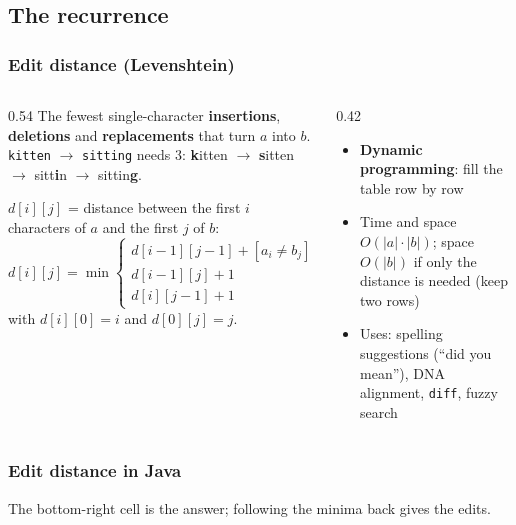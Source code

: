 \documentclass[aspectratio=169,10pt,compress]{beamer}
\begin{document}
\subsection[Recurrence]{The recurrence}




\begin{frame}[t,fragile] \frametitle{Edit distance (Levenshtein)}
  \begin{columns}[T]
    \begin{column}{0.54\textwidth}
      \small The fewest single-character \textbf{insertions}, \textbf{deletions} and \textbf{replacements}
      that turn $a$ into $b$. \texttt{kitten} $\to$ \texttt{sitting} needs 3:
      \textbf{k}itten $\to$ \textbf{s}itten $\to$ sitt\textbf{i}n $\to$ sittin\textbf{g}.

      \vspace{0.3em}
      $d[i][j]$ = distance between the first $i$ characters of $a$ and the first $j$ of $b$:
      \[
      	d[i][j] = \min
      	\begin{cases}
      		d[i-1][j-1] + [a_{i} \neq b_{j}] & \text{replace or keep} \\
      		d[i-1][j] + 1 & \text{delete } a_{i} \\
      		d[i][j-1] + 1 & \text{insert } b_{j}
      	\end{cases}
      \]
      with $d[i][0] = i$ and $d[0][j] = j$.
    \end{column}
    \begin{column}{0.42\textwidth}
      \begin{itemize}\small
        \item \textbf{Dynamic programming}: fill the table row by row
        \item Time and space $O(|a| \cdot |b|)$; space $O(|b|)$ if only the distance is needed (keep two rows)
        \item Uses: spelling suggestions (``did you mean''), DNA alignment, \texttt{diff}, fuzzy search
      \end{itemize}
    \end{column}
  \end{columns}
\end{frame}




\begin{frame}[t,fragile] \frametitle{Edit distance in Java}

  \vspace{0.2em}
  \small The bottom-right cell is the answer; following the minima back gives the edits.
\end{frame}
\end{document}
